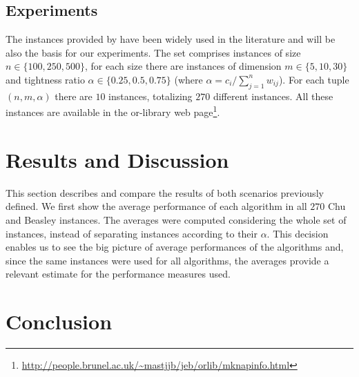 \documentclass[3p,authoryear]{elsarticle}
\newcommand{\Orlib}{{\sc or-library}\xspace}
\begin{document}
%
%
%
%
%
%
\subsection{Experiments}

The instances provided by \cite{chu1998} have been widely used in the literature and will be also the basis for our experiments. The set comprises instances of size $n\in\{100,250,500\}$, for each size there are instances of dimension $m\in\{5,10,30\}$ and tightness ratio $\alpha\in\{0.25,0.5,0.75\}$ (where $\alpha=c_i/\sum_{j=1}^n w_{ij}$). For each tuple $(n, m, \alpha)$ there are $10$ instances, totalizing $270$ different instances. All these instances are available in the \Orlib web page\footnote{\url{http://people.brunel.ac.uk/~mastjjb/jeb/orlib/mknapinfo.html}}.



































%
%
%
%
%
%
\section{Results and Discussion}\label{sec:results}
This section describes and compare the results of both scenarios previously defined. We first show the  average performance of each algorithm in all $270$ Chu and Beasley instances. The averages were computed considering the whole set of instances, instead of separating instances according to their $\alpha$. This decision enables us to see the big picture of average performances of the algorithms and, since the same instances were used for all algorithms, the averages provide a relevant estimate for the performance measures used.
%
%
%
%
%



%
%
%
%
%
\section{Conclusion}\label{sec:conclusions}


%
%
%
%
%


\end{document}
